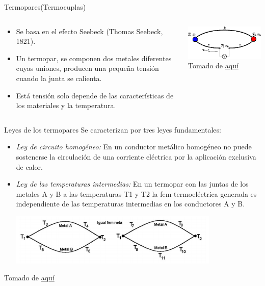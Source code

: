 \documentclass[aspectratio=169]{beamer}
\begin{document}
\begin{frame}{Termopares(Termocuplas)}
    \begin{columns}[c, onlytextwidth]
        \begin{column}{0.55\textwidth}
            \begin{itemize}
                \item Se basa en el efecto Seebeck (Thomas Seebeck, 1821). 
                \item Un termopar, se componen dos metales diferentes cuyas uniones, producen una pequeña tensión cuando la junta se calienta. 
                \item Está tensión solo depende de las características de los materiales y la temperatura. 
            \end{itemize}
        \end{column}
        \begin{column}{0.40\textwidth}
        \includegraphics[width=6cm]{fig/seebeekc.png}
            \tiny{Tomado de \href{https://www.iue.tuwien.ac.at/phd/mwagner/node14.html}{aquí}}
        \end{column}
    \end{columns}
\end{frame}
\begin{frame}{Leyes de los termopares}
    Se caracterizan por tres leyes fundamentales:\\[8pt]
    \begin{itemize}
        \item \emph{Ley de circuito homogéneo: } En un conductor metálico homogéneo no puede sostenerse la circulación de una corriente eléctrica por la aplicación exclusiva de calor.
        \item \emph{Ley de las temperaturas intermedias: } En un termopar con las juntas de los metales A y B a las temperaturas T1 y T2 la fem termoeléctrica generada es independiente de las temperaturas intermedias en los conductores A y B.
        \begin{center}
            \includegraphics[width=10cm]{fig/ley2.PNG}
        \end{center}
    \end{itemize}
    \tiny{Tomado de \href{http://laboratorios.fi.uba.ar/lscm/termocuplas01.pdf}{aquí}}
\end{frame}
\end{document}
